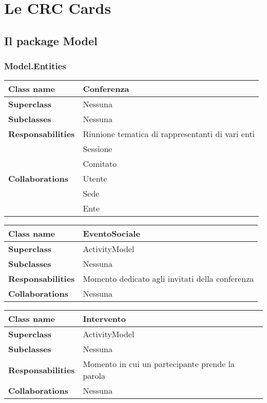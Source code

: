 \section{Le CRC Cards}
\subsection{Il package Model}
\subsubsection{Model.Entities}
\begin{table}[h!]

	\begin{tabular}{|l|l|}
		\hline
		\textbf{Class name} & Conferenza \\ \hline
		\textbf{Superclass} & Nessuna \\ \hline
		\textbf{Subclasses} & Nessuna\\ \hline
		\textbf{Responsabilities} & Riunione tematica di rappresentanti di vari enti \\ \hline
		\multirow{5}{*}{\textbf{Collaborations}} & Sessione \\ 
		& Comitato \\
		& Utente \\
		& Sede \\
		& Ente \\ \hline
	\end{tabular}
\end{table}
\begin{table}[h!]	
		\begin{tabular}{|l|l|}
	\hline
	\textbf{Class name} & EventoSociale \\ \hline
	\textbf{Superclass} & ActivityModel \\ \hline
	\textbf{Subclasses} & Nessuna\\ \hline
	\textbf{Responsabilities} & Momento dedicato agli invitati della conferenza \\ \hline
	\textbf{Collaborations} & Nessuna \\ \hline
\end{tabular}
\end{table} 
\begin{table}[h!]
\begin{tabular}{|l|l|}
		\hline
		\textbf{Class name} & Intervento \\ \hline
		\textbf{Superclass} & ActivityModel \\ \hline
		\textbf{Subclasses} & Nessuna\\ \hline
		\textbf{Responsabilities} & Momento in cui un partecipante prende la parola \\ \hline
		\textbf{Collaborations} & Nessuna \\ \hline
	\end{tabular}
\end{table}
